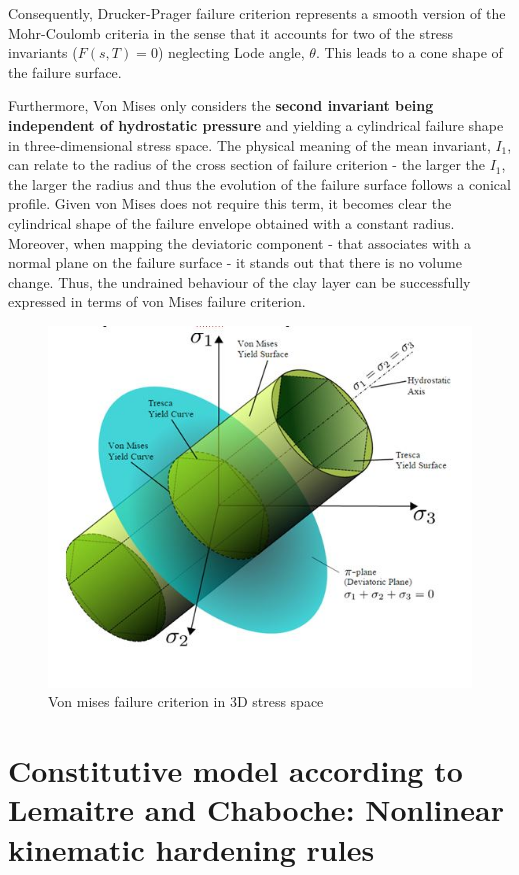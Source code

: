 \documentclass[12pt,a4paper]{report}
\begin{document}
Consequently, Drucker-Prager failure criterion represents a smooth version of the Mohr-Coulomb criteria in the sense that it accounts for two of the stress invariants ($F (s, T) = 0$) neglecting Lode angle, $\theta$. This leads to a cone shape of the failure surface. 

Furthermore, Von Mises only considers the \textbf{second invariant being independent of hydrostatic pressure }and yielding a cylindrical failure shape in three-dimensional stress space. The physical meaning of the mean invariant, $I_1$, can relate to the radius of the cross section of failure criterion - the larger the $I_1$, the larger the radius and thus the evolution of the failure surface follows a conical profile. Given von Mises does not require this term,  it becomes clear the cylindrical shape of the failure envelope obtained with a constant radius. Moreover, when mapping the deviatoric component - that associates with a normal plane on the failure surface - it stands out that there is no volume change. Thus, the undrained behaviour of the clay layer can be successfully expressed in terms of von Mises failure criterion. 

\begin{figure}[h!]
	\centering
	\includegraphics[width=0.8\linewidth]{"Mises"}
	\caption{Von mises failure criterion in 3D stress space}
	\label{Mises}
\end{figure}

\section{Constitutive model according to Lemaitre and Chaboche: Nonlinear kinematic hardening rules }
\end{document}
